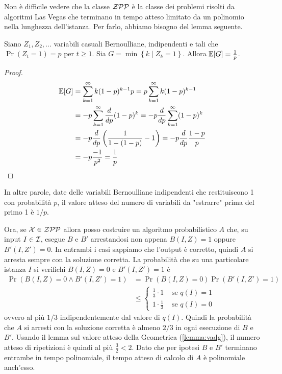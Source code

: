 Non è difficile vedere che la classe $\mathcal{ZPP}$ è la classe dei problemi risolti da algoritmi Las Vegas che terminano in tempo atteso limitato da un polinomio nella lunghezza dell'istanza. Per farlo, abbiamo bisogno del lemma seguente. \\

\begin{lemma}
    \label{lemma:vadg}
    Siano $Z_1, Z_2, \dots$ variabili casuali Bernoulliane, indipendenti e tali che $\Pr(Z_t = 1) = p$ per $t \geq 1$. Sia $G = \min\left\{k \mid Z_k = 1\right\}$. Allora $\mathbb{E} [G] = \frac{1}{p}$.
\end{lemma}
\begin{proof}
    \begin{align*}
        \mathbb{E}[G] & = \sum_{k=1}^\infty k (1 - p)^{k-1} p
        = p \sum_{k=1}^\infty k (1 - p)^{k-1} \\
        & = -p \sum_{k=1}^\infty \frac{d}{dp} (1 - p)^{k}
        = -p \frac{d}{dp} \sum_{k=1}^\infty (1 - p)^k \\
        & = -p \frac{d}{dp} \left(\frac{1}{1 - (1 - p)} - 1\right)
        = -p \frac{d}{dp} \frac{1 - p}{p} \\
        & = -p \frac{-1}{p^2} = \frac{1}{p}
    \end{align*}
\end{proof}

In altre parole, date delle variabili Bernoulliane indipendenti che restituiscono 1 con probabilità $p$, il valore atteso del numero di variabili da "estrarre" prima del primo 1 è $1/p$.

Ora, se $\mathcal{X} \in \mathcal{ZPP}$ allora posso costruire un algoritmo probabilistico $A$ che, su input $I \in \mathcal{I}$, esegue $B$ e $B'$ arrestandosi non appena $B(I, Z) = 1$ oppure $B'(I, Z') = 0$. In entrambi i casi sappiamo che l'output è corretto, quindi $A$ si arresta sempre con la soluzione corretta. La probabilità che su una particolare istanza $I$ si verifichi $B(I, Z) = 0$ e $B'(I, Z') = 1$ è
\begin{align*}
    \Pr \left(B(I, Z) = 0 \wedge B'(I, Z') = 1\right) & = \Pr \left(B(I, Z) = 0\right) \Pr \left(B'(I,Z') = 1\right) \\
    & \leq \begin{cases}
        \frac{1}{3} \cdot 1 & \text{ se } q(I) = 1 \\
        1 \cdot \frac{1}{3} & \text{ se } q(I) = 0
    \end{cases}
\end{align*}
ovvero al più $1/3$ indipendentemente dal valore di $q(I)$. Quindi la probabilità che $A$ si arresti con la soluzione corretta è almeno $2/3$ in ogni esecuzione di $B$ e $B'$. Usando il lemma sul valore atteso della Geometrica (\ref{lemma:vadg}), il numero atteso di ripetizioni è quindi al più $\frac{3}{2} < 2$. Dato che per ipotesi $B$ e $B'$ terminano entrambe in tempo polinomiale, il tempo atteso di calcolo di $A$ è polinomiale anch'esso.

